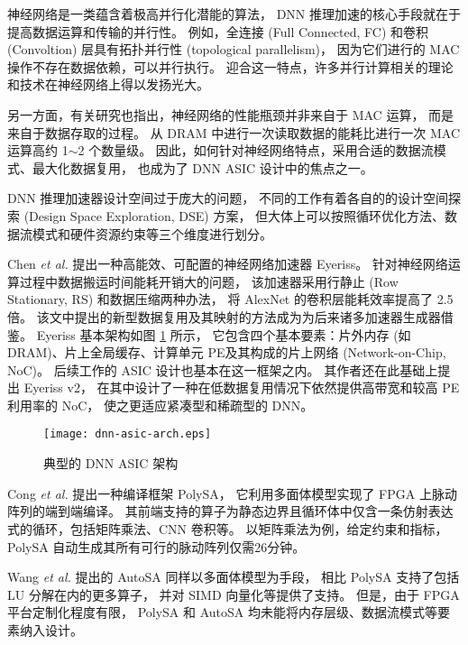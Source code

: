 神经网络是一类蕴含着极高并行化潜能的算法，
DNN 推理加速的核心手段就在于提高数据运算和传输的并行性。
例如，全连接 (Full Connected, FC) 和卷积 (Convoltion) 层具有拓扑并行性 (topological parallelism)，
因为它们进行的 MAC 操作不存在数据依赖，可以并行执行。
迎合这一特点，许多并行计算相关的理论和技术在神经网络上得以发扬光大\cite{sze_efficient_2017}。

另一方面，有关研究也指出，神经网络的性能瓶颈并非来自于 MAC 运算，
而是来自于数据存取的过程\cite{chen_diannao_2014}。
从 DRAM 中进行一次读取数据的能耗比进行一次 MAC 运算高约 1$\sim$2 个数量级。
因此，如何针对神经网络特点，采用合适的数据流模式、最大化数据复用，
也成为了 DNN ASIC 设计中的焦点之一\cite{chen_using_2017}。

DNN 推理加速器设计空间过于庞大的问题，
不同的工作有着各自的的设计空间探索 (Design Space Exploration, DSE) 方案，
但大体上可以按照循环优化方法、数据流模式和硬件资源约束等三个维度进行划分\cite{yang_interstellar_2020}。

Chen \textit{et al.}\cite{chen_eyeriss_2016}
提出一种高能效、可配置的神经网络加速器 Eyeriss。
针对神经网络运算过程中数据搬运时间能耗开销大的问题，
该加速器采用行静止 (Row Stationary, RS) 和数据压缩两种办法，
将 AlexNet 的卷积层能耗效率提高了 2.5 倍。
该文中提出的新型数据复用及其映射的方法成为为后来诸多加速器生成器借鉴。
Eyeriss 基本架构如图 \ref{dnn-asic-arch} 所示，
它包含四个基本要素：片外内存 (如DRAM)、片上全局缓存、计算单元 PE及其构成的片上网络 (Network-on-Chip, NoC)。
后续工作的 ASIC 设计也基本在这一框架之内。
其作者还在此基础上提出 Eyeriss v2\cite{chen_eyeriss_2019}，
在其中设计了一种在低数据复用情况下依然提供高带宽和较高 PE 利用率的 NoC，
使之更适应紧凑型和稀疏型的 DNN。

\begin{figure}[htbp]
    \centering
    \texttt{[image: dnn-asic-arch.eps]}
    \caption{典型的 DNN ASIC 架构}
    \label{dnn-asic-arch}
\end{figure}

Cong \textit{et al.}\cite{cong_polysa_2018} 
提出一种编译框架 PolySA，
它利用多面体模型实现了 FPGA 上脉动阵列的端到端编译。
其前端支持的算子为静态边界且循环体中仅含一条仿射表达式的循环，包括矩阵乘法、CNN 卷积等。
以矩阵乘法为例，给定约束和指标，PolySA 自动生成其所有可行的脉动阵列仅需26分钟。

Wang \textit{et al.}\cite{wang_autosa_2021} 
提出的 AutoSA 同样以多面体模型为手段，
相比 PolySA 支持了包括 LU 分解在内的更多算子，
并对 SIMD 向量化等提供了支持。
但是，由于 FPGA 平台定制化程度有限，
PolySA 和 AutoSA 均未能将内存层级、数据流模式等要素纳入设计。

